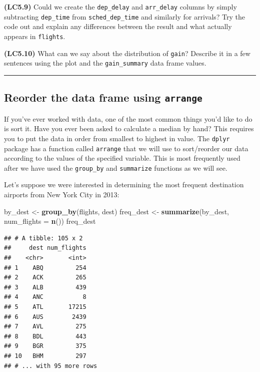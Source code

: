 \documentclass[]{tufte-book}
\newenvironment{Shaded}{\begin{snugshade}}{\end{snugshade}}
\newcommand{\KeywordTok}[1]{\textcolor[rgb]{0.13,0.29,0.53}{\textbf{{#1}}}}
\newcommand{\DataTypeTok}[1]{\textcolor[rgb]{0.13,0.29,0.53}{{#1}}}
\newcommand{\StringTok}[1]{\textcolor[rgb]{0.31,0.60,0.02}{{#1}}}
\newcommand{\NormalTok}[1]{{#1}}
\begin{document}
\textbf{(LC5.9)} Could we create the \texttt{dep\_delay} and
\texttt{arr\_delay} columns by simply subtracting \texttt{dep\_time}
from \texttt{sched\_dep\_time} and similarly for arrivals? Try the code
out and explain any differences between the result and what actually
appears in \texttt{flights}.

\textbf{(LC5.10)} What can we say about the distribution of
\texttt{gain}? Describe it in a few sentences using the plot and the
\texttt{gain\_summary} data frame values.

\begin{center}\rule{\linewidth}{\linethickness}\end{center}

\subsection{\texorpdfstring{Reorder the data frame using
\texttt{arrange}}{Reorder the data frame using arrange}}\label{reorder-the-data-frame-using-arrange}

If you've ever worked with data, one of the most common things you'd
like to do is sort it. Have you ever been asked to calculate a median by
hand? This requires you to put the data in order from smallest to
highest in value. The \texttt{dplyr} package has a function called
\texttt{arrange} that we will use to sort/reorder our data according to
the values of the specified variable. This is most frequently used after
we have used the \texttt{group\_by} and \texttt{summarize} functions as
we will see.

Let's suppose we were interested in determining the most frequent
destination airports from New York City in 2013:

\begin{Shaded}
\begin{Highlighting}[]
\NormalTok{by_dest <-}\StringTok{ }\KeywordTok{group_by}\NormalTok{(flights, dest)}
\NormalTok{freq_dest <-}\StringTok{ }\KeywordTok{summarize}\NormalTok{(by_dest, }\DataTypeTok{num_flights =} \KeywordTok{n}\NormalTok{())}
\NormalTok{freq_dest}
\end{Highlighting}
\end{Shaded}

\begin{verbatim}
## # A tibble: 105 x 2
##     dest num_flights
##    <chr>       <int>
## 1    ABQ         254
## 2    ACK         265
## 3    ALB         439
## 4    ANC           8
## 5    ATL       17215
## 6    AUS        2439
## 7    AVL         275
## 8    BDL         443
## 9    BGR         375
## 10   BHM         297
## # ... with 95 more rows
\end{verbatim}
\end{document}
